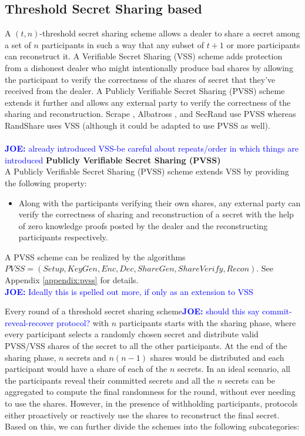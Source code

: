 \documentclass[letterpaper,twocolumn,10pt]{article}
\theoremstyle{definition}
\theoremstyle{remark}
\newcommand{\joenote}[1]{\textcolor{blue}{\textbf{JOE:} #1}}
\begin{document}
\subsection{Threshold Secret Sharing based}
A $(t, n)$-threshold secret sharing scheme allows a dealer to share a secret among a set of $n$ participants in such a way that any subset of $t+1$ or more participants can reconstruct it. A Verifiable Secret Sharing (VSS) scheme \cite{feldman1987practical, pedersen1991non} adds protection from a dishonest dealer who might intentionally produce bad shares by allowing the participant to verify the correctness of the shares of secret that they've received from the dealer. A Publicly Verifiable Secret Sharing (PVSS) scheme \cite{schoenmakers1999simple, cascudo2017scrape} extends it further and allows any external party to verify the correctness of the sharing and reconstruction. Scrape \cite{cascudo2017scrape}, Albatross \cite{cascudo2020albatross}, and SecRand \cite{guo2020secRand} use PVSS whereas RandShare \cite{syta2017scalable} uses VSS (although it could be adapted to use PVSS as well).\\\\
\joenote{already introduced VSS-be careful about repeats/order in which things are introduced}
\textbf{Publicly Verifiable Secret Sharing (PVSS)}\\
A Publicly Verifiable Secret Sharing (PVSS) scheme extends VSS by providing the following property:
\begin{itemize}
    \item Along with the participants verifying their own shares, any external party can verify the correctness of sharing and reconstruction of a secret with the help of zero knowledge proofs posted by the dealer and the reconstructing participants respectively.
\end{itemize}
A PVSS scheme can be realized by the algorithms $PVSS = (Setup, KeyGen, Enc, Dec, ShareGen, ShareVerify, Recon)$. See Appendix \ref{appendix:pvss} for details.\\
\joenote{Ideally this is spelled out more, if only as an extension to VSS}

Every round of a threshold secret sharing scheme\joenote{should this say commit-reveal-recover protocol?} with $n$ participants starts with the sharing phase, where every participant selects a randomly chosen secret and distribute valid PVSS/VSS shares of the secret to all the other participants. At the end of the sharing phase, $n$ secrets and $n(n-1)$ shares would be distributed and each participant would have a share of each of the $n$ secrets. In an ideal scenario, all the participants reveal their committed secrets and all the $n$ secrets can be aggregated to compute the final randomness for the round, without ever needing to use the shares. However, in the presence of withholding participants, protocols either proactively or reactively use the shares to reconstruct the final secret. Based on this, we can further divide the schemes into the following subcategories:
\end{document}
